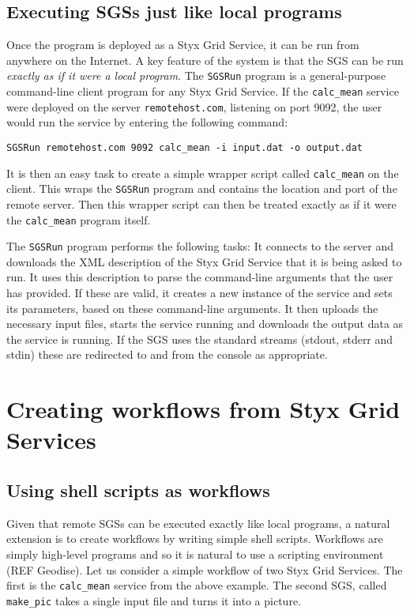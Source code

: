 \documentclass{llncs}
\begin{document}
\subsection{Executing SGSs just like local programs}

Once the program is deployed as a Styx Grid Service, it can be run from anywhere on the Internet.  A key feature of the system is that the SGS can be run {\em exactly as if it were a local program\/}.  The {\tt SGSRun} program is a general-purpose command-line client program for any Styx Grid Service.  If the {\tt calc\_mean} service were deployed on the server {\tt remotehost.com}, listening on port 9092, the user would run the service by entering the following command:

\begin{verbatim}
SGSRun remotehost.com 9092 calc_mean -i input.dat -o output.dat
\end{verbatim}

It is then an easy task to create a simple wrapper script called {\tt calc\_mean} on the client.  This wraps the {\tt SGSRun} program and contains the location and port of the remote server.  Then this wrapper script can then be treated exactly as if it were the {\tt calc\_mean} program itself.

The {\tt SGSRun} program performs the following tasks:  It connects to the server and downloads the XML description of the Styx Grid Service that it is being asked to run.  It uses this description to parse the command-line arguments that the user has provided.  If these are valid, it creates a new instance of the service and sets its parameters, based on these command-line arguments.  It then uploads the necessary input files, starts the service running and downloads the output data as the service is running.  If the SGS uses the standard streams (stdout, stderr and stdin) these are redirected to and from the console as appropriate.


\section{Creating workflows from Styx Grid Services}

\subsection{Using shell scripts as workflows}
Given that remote SGSs can be executed exactly like local programs, a natural extension is to create workflows by writing simple shell scripts.  Workflows are simply high-level programs and so it is natural to use a scripting environment (REF Geodise).  Let us consider a simple workflow of two Styx Grid Services.  The first is the {\tt calc\_mean} service from the above example.  The second SGS, called {\tt make\_pic} takes a single input file and turns it into a picture.
\end{document}
